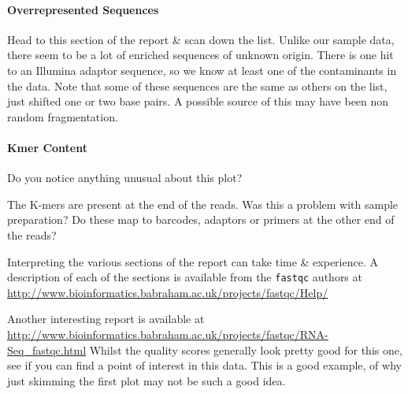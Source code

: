 \paragraph{Overrepresented Sequences}
Head to this section of the report \& scan down the list.
Unlike our sample data, there seem to be a lot of enriched sequences of unknown origin.
There is one hit to an Illumina adaptor sequence, so we know at least one of the contaminants in the data.
Note that some of these sequences are the same as others on the list, just shifted one or two base pairs.
A possible source of this may have been non random fragmentation.

\paragraph{Kmer Content}
\begin{questions}
Do you notice anything unusual about this plot?\\
\begin{answer}
The K-mers are present at the end of the reads.
Was this a problem with sample preparation? 
Do these map to barcodes, adaptors or primers at the other end of the reads? \\
\end{answer}
\end{questions}

\begin{information}
Interpreting the various sections of the report can take time \& experience.
A description of each of the sections is available from the \texttt{fastqc} authors at \url{http://www.bioinformatics.babraham.ac.uk/projects/fastqc/Help/}
\end{information}

\begin{bonus}
Another interesting report is available at \url{http://www.bioinformatics.babraham.ac.uk/projects/fastqc/RNA-Seq_fastqc.html}
Whilst the quality scores generally look pretty good for this one, see if you can find a point of interest in this data.
This is a good example, of why just skimming the first plot may not be such a good idea.
\end{bonus}

